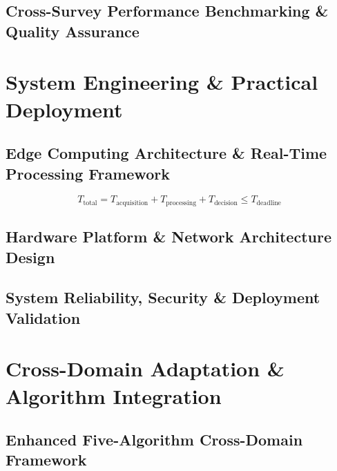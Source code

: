 \documentclass[journal]{IEEEtran}
\begin{document}
\subsection{Cross-Survey Performance Benchmarking \& Quality Assurance}

\section{System Engineering \& Practical Deployment}
\label{sec:system_engineering}


\subsection{Edge Computing Architecture \& Real-Time Processing Framework}

\begin{equation}
T_{\text{total}} = T_{\text{acquisition}} + T_{\text{processing}} + T_{\text{decision}} \leq T_{\text{deadline}}
\label{eq:realtime_constraint}
\end{equation}

\subsection{Hardware Platform \& Network Architecture Design}

\subsection{System Reliability, Security \& Deployment Validation}

\section{Cross-Domain Adaptation \& Algorithm Integration}
\label{sec:cross_domain}

\subsection{Enhanced Five-Algorithm Cross-Domain Framework}
\end{document}
